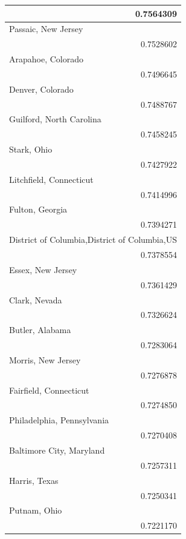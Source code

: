\documentclass[
]{article}
\begin{document}
\begin{longtable}{r}
\midrule
0.7564309 \\ 
\midrule
\multicolumn{1}{l}{Passaic, New Jersey} \\ 
\midrule
0.7528602 \\ 
\midrule
\multicolumn{1}{l}{Arapahoe, Colorado} \\ 
\midrule
0.7496645 \\ 
\midrule
\multicolumn{1}{l}{Denver, Colorado} \\ 
\midrule
0.7488767 \\ 
\midrule
\multicolumn{1}{l}{Guilford, North Carolina} \\ 
\midrule
0.7458245 \\ 
\midrule
\multicolumn{1}{l}{Stark, Ohio} \\ 
\midrule
0.7427922 \\ 
\midrule
\multicolumn{1}{l}{Litchfield, Connecticut} \\ 
\midrule
0.7414996 \\ 
\midrule
\multicolumn{1}{l}{Fulton, Georgia} \\ 
\midrule
0.7394271 \\ 
\midrule
\multicolumn{1}{l}{District of Columbia,District of Columbia,US} \\ 
\midrule
0.7378554 \\ 
\midrule
\multicolumn{1}{l}{Essex, New Jersey} \\ 
\midrule
0.7361429 \\ 
\midrule
\multicolumn{1}{l}{Clark, Nevada} \\ 
\midrule
0.7326624 \\ 
\midrule
\multicolumn{1}{l}{Butler, Alabama} \\ 
\midrule
0.7283064 \\ 
\midrule
\multicolumn{1}{l}{Morris, New Jersey} \\ 
\midrule
0.7276878 \\ 
\midrule
\multicolumn{1}{l}{Fairfield, Connecticut} \\ 
\midrule
0.7274850 \\ 
\midrule
\multicolumn{1}{l}{Philadelphia, Pennsylvania} \\ 
\midrule
0.7270408 \\ 
\midrule
\multicolumn{1}{l}{Baltimore City, Maryland} \\ 
\midrule
0.7257311 \\ 
\midrule
\multicolumn{1}{l}{Harris, Texas} \\ 
\midrule
0.7250341 \\ 
\midrule
\multicolumn{1}{l}{Putnam, Ohio} \\ 
0.7221170 \\ 
\bottomrule
\end{longtable}
\end{document}
